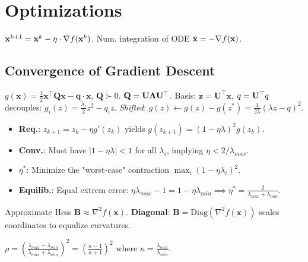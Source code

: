 \section{Optimizations}
\begin{definition}[GD]
    \(\vb{x}^{k+1} = \vb{x}^{k} - \eta \cdot \nabla f(\vb{x}^{k})\). Num. integration of ODE \(\dot{\vb{x}} = - \nabla f(\vb{x})\).
\end{definition}

\subsection{Convergence of Gradient Descent}

\begin{definition}[Setup]
    $g(\mathbf{x}) = \frac{1}{2}\mathbf{x}^\top \mathbf{Q} \mathbf{x} - \mathbf{q} \cdot \mathbf{x}$, \(\mathbf Q \succ 0\).
    $\mathbf{Q} = \vb{U} \vb*{\Lambda}\vb{U}^\top$. Basis: $\mathbf{z} = \mathbf{U}^\top \mathbf{x}$, $q = \vb{U}^\top q$ decouples: $g_i(z) = \frac{\lambda_i}{2}z^2 - q_i z$.
    \textit{Shifted}: $g(z) \leftarrow g(z) - g(z^*) = \frac{1}{2\lambda}(\lambda z - q)^2$.
\end{definition}

\begin{theorem}
    \begin{itemize}
        \item \textbf{Req.}: $z_{k+1} = z_k - \eta g'(z_k)$ yields $g(z_{k+1}) = (1-\eta\lambda)^2 g(z_k)$.
        \item \textbf{Conv.}: Must have $|1-\eta\lambda| < 1$ for all $\lambda_i$, implying $\eta < 2/\lambda_{max}$.
        \item \textbf{$\eta^*$}: Minimize the "worst-case" contraction $\max_i (1-\eta\lambda_i)^2$. 
        \item \textbf{Equilib.}: Equal extrem error: $\eta\lambda_{max} - 1 = 1 - \eta\lambda_{min} \implies \eta^* = \frac{2}{\lambda_{max} + \lambda_{min}}$.
    \end{itemize}
\end{theorem}

\begin{definition}
    Approximate Hess $\mathbf{B} \approx \nabla^2 f(\mathbf{x})$.
    \textbf{Diagonal}: $\mathbf{B} = \text{Diag}(\nabla^2 f(\mathbf{x}))$ scales coordinates to equalize curvatures.
\end{definition}

\begin{definition}
    $\rho = (\frac{\lambda_{max} - \lambda_{min}}{\lambda_{max} + \lambda_{min}})^2 = (\frac{\kappa - 1}{\kappa + 1})^2$ where $\kappa = \frac{\lambda_{max}}{\lambda_{min}}$.
\end{definition}

